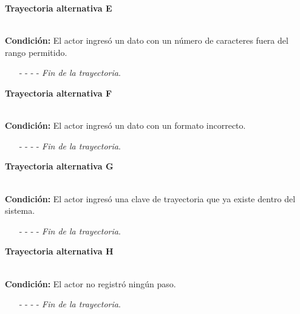 \hypertarget{CU12-1-1-2:TAE}{\textbf{Trayectoria alternativa E}}\\
\noindent \textbf{Condición:} El actor ingresó un dato con un número de caracteres fuera del rango permitido.
\begin{enumerate}
	\UCpaso[\UCsist] Muestra el mensaje  señalando el campo que presenta el error en la pantalla .
	\UCpaso Regresa al paso \ref{CU12.1.1.2-P15} de la trayectoria principal.
	\item[- -] - - {\em {Fin de la trayectoria}}.%
\end{enumerate}
\hypertarget{CU12-1-1-2:TAF}{\textbf{Trayectoria alternativa F}}\\
\noindent \textbf{Condición:} El actor ingresó un dato con un formato incorrecto.
\begin{enumerate}
	\UCpaso[\UCsist] Muestra el mensaje  señalando el campo que presenta el error en la pantalla .
	\UCpaso Regresa al paso \ref{CU12.1.1.2-P15} de la trayectoria principal.
	\item[- -] - - {\em {Fin de la trayectoria}}.
\end{enumerate}
\hypertarget{CU2-1-1-2:TAG}{\textbf{Trayectoria alternativa G}}\\
\noindent \textbf{Condición:} El actor ingresó una clave de trayectoria que ya existe dentro del sistema.
\begin{enumerate}
	\UCpaso[\UCsist] Muestra el mensaje  señalando el campo que presenta la duplicidad en la pantalla .
	\UCpaso Regresa al paso \ref{CU12.1.1.2-P15} de la trayectoria principal.
	\item[- -] - - {\em {Fin de la trayectoria}}.
\end{enumerate}
\hypertarget{CU12-1-1-2:TAH}{\textbf{Trayectoria alternativa H}}\\
\noindent \textbf{Condición:} El actor no registró ningún paso.
\begin{enumerate}
	\UCpaso[\UCsist] Muestra el mensaje  en la sección de pasos de la pantalla .
	\UCpaso Regresa al paso \ref{CU12.1.1.2-P15} de la trayectoria principal.
	\item[- -] - - {\em {Fin de la trayectoria}}.
\end{enumerate}
